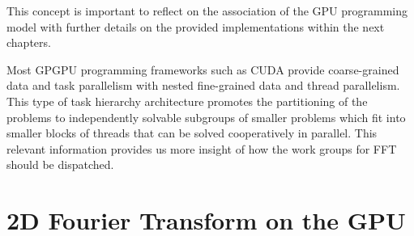 \documentclass[
  oneside,
  11pt, a4paper,
  footinclude=true,
  headinclude=true,
  cleardoublepage=empty
]{scrbook}
\begin{document}

This concept is important to reflect on the association of the GPU programming model with further details on the provided implementations within the next chapters. \newline

Most GPGPU programming frameworks such as CUDA provide coarse-grained data and task parallelism with nested fine-grained data and thread parallelism. This type of task hierarchy architecture promotes the partitioning of the problems to independently solvable subgroups of smaller problems which fit into smaller blocks of threads that can be solved cooperatively in parallel. This relevant information provides us more insight of how the work groups for FFT should be dispatched.






\section{2D Fourier Transform on the GPU}
\end{document}

